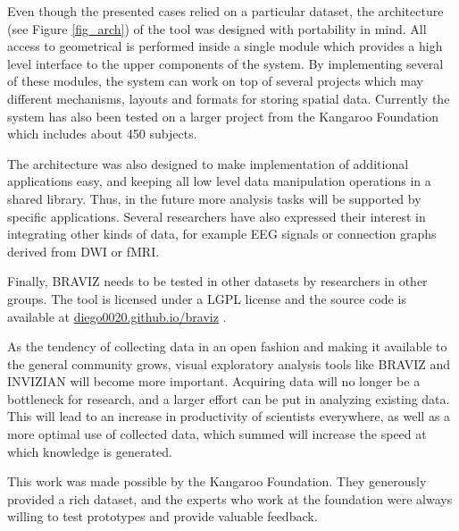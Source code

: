 \documentclass[twocolumn]{svjour3}
\begin{document}
Even though the presented cases relied on a particular dataset, the architecture (see Figure \ref{fig_arch}) of the tool was designed with portability in mind. All access to geometrical is performed inside a single module which provides a high level interface to the upper components of the system. By implementing several of these modules, the system can work on top of several projects which may different mechanisms, layouts and formats for storing spatial data. Currently the system has also been tested on a larger project from the Kangaroo Foundation which includes about 450 subjects. 

The architecture was also designed to make implementation of additional applications easy, and keeping all low level data manipulation operations in a shared library. Thus, in the future more analysis tasks will be supported by specific applications. Several researchers have also expressed their interest in integrating other kinds of data, for example EEG signals or connection graphs \cite{rubinov_complex_2010} derived from DWI or fMRI. 

Finally, BRAVIZ needs to be tested in other datasets by researchers in other groups. The tool is licensed under a LGPL license and the source code is available at \url{diego0020.github.io/braviz} . 

As the tendency of collecting data in an open fashion and making it available to the general community grows, visual exploratory analysis tools like BRAVIZ and INVIZIAN will become more important. Acquiring data will no longer be a bottleneck for research, and a larger effort can be put in analyzing existing data. This will lead to an increase in productivity of scientists everywhere, as well as a more optimal use of collected data, which summed will increase the speed at which knowledge is generated.

\begin{acknowledgements}

This work was made possible by the Kangaroo Foundation. They generously provided a rich dataset, and the experts who work at the foundation were always willing to test prototypes and provide valuable feedback.

\end{acknowledgements}

 

\end{document}
